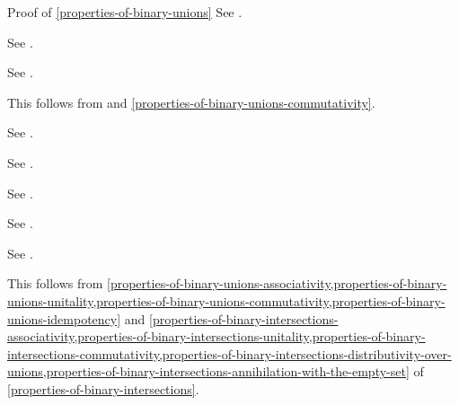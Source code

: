 \begin{Proof}{Proof of \cref{properties-of-binary-unions}}%
    See \cite{proof-wiki:set-union-preserves-subsets}.

    See \cite{proof-wiki:union-as-symmetric-difference-with-intersection}.

    See \cite{proof-wiki:union-is-associative}.

    This follows from \cite{proof-wiki:union-with-empty-set} and \cref{properties-of-binary-unions-commutativity}.

    See \cite{proof-wiki:union-is-commutative}.

    See \cite{proof-wiki:set-union-is-idempotent}.

    See \cite{proof-wiki:union-distributes-over-intersection}.

    See \cite{proof-wiki:characteristic-function-of-union}.

    See \cite{proof-wiki:characteristic-function-of-union}.

    This follows from \cref{properties-of-binary-unions-associativity,properties-of-binary-unions-unitality,properties-of-binary-unions-commutativity,properties-of-binary-unions-idempotency} and \cref{properties-of-binary-intersections-associativity,properties-of-binary-intersections-unitality,properties-of-binary-intersections-commutativity,properties-of-binary-intersections-distributivity-over-unions,properties-of-binary-intersections-annihilation-with-the-empty-set} of \cref{properties-of-binary-intersections}.
\end{Proof}
